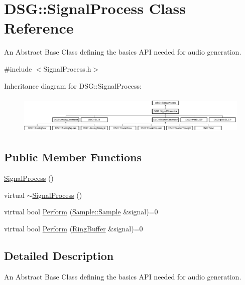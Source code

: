 \hypertarget{classDSG_1_1SignalProcess}{\section{D\+S\+G\+:\+:Signal\+Process Class Reference}
\label{classDSG_1_1SignalProcess}
}


An Abstract Base Class defining the basics A\+P\+I needed for audio generation.  




{\ttfamily \#include $<$Signal\+Process.\+h$>$}

Inheritance diagram for D\+S\+G\+:\+:Signal\+Process\+:\begin{figure}[H]
\begin{center}
\leavevmode
\includegraphics[height=1.854305cm]{classDSG_1_1SignalProcess}
\end{center}
\end{figure}
\subsection*{Public Member Functions}
\begin{DoxyCompactItemize}
\item 
\hyperlink{classDSG_1_1SignalProcess_a3fd4347483bcf3cc0a3d7bf98ff56218}{Signal\+Process} ()
\item 
virtual \hyperlink{classDSG_1_1SignalProcess_ad9b6a758241a092ddc38e13effc9553f}{$\sim$\+Signal\+Process} ()
\item 
virtual bool \hyperlink{classDSG_1_1SignalProcess_afdb8220100418893950c1161dd24db67}{Perform} (\hyperlink{classDSG_1_1Sample_aaf2e30d73911eccea99b53eeee15b612}{Sample\+::\+Sample} \&signal)=0
\item 
virtual bool \hyperlink{classDSG_1_1SignalProcess_a9df44fe60cca01c3c697283408cecf4d}{Perform} (\hyperlink{classDSG_1_1RingBuffer}{Ring\+Buffer} \&signal)=0
\end{DoxyCompactItemize}


\subsection{Detailed Description}
An Abstract Base Class defining the basics A\+P\+I needed for audio generation. 

